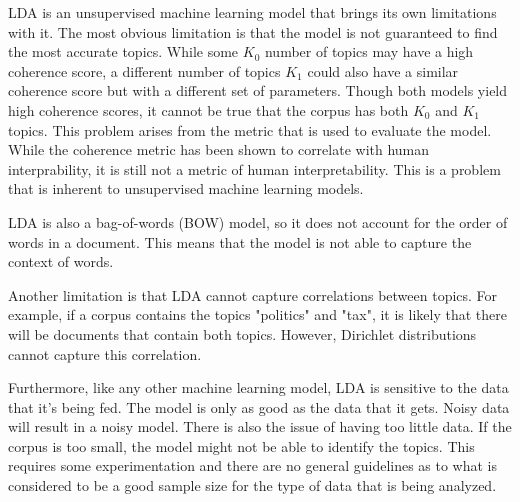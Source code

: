 LDA is an unsupervised machine learning model that brings its own limitations with it. The most obvious limitation is that the model is not guaranteed to find the most accurate topics. While some $K_0$ number of topics may have a high coherence score, a different number of topics $K_1$ could also have a similar coherence score but with a different set of parameters. Though both models yield high coherence scores, it cannot be true that the corpus has both $K_0$ and $K_1$ topics. This problem arises from the metric that is used to evaluate the model. While the coherence metric has been shown to correlate with human interprability, it is still not a metric of human interpretability. This is a problem that is inherent to unsupervised machine learning models.

LDA is also a bag-of-words (BOW) model, so it does not account for the order of words in a document. This means that the model is not able to capture the context of words.

Another limitation is that LDA cannot capture correlations between topics. For example, if a corpus contains the topics "politics" and "tax", it is likely that there will be documents that contain both topics. However, Dirichlet distributions cannot capture this correlation.

Furthermore, like any other machine learning model, LDA is sensitive to the data that it's being fed. The model is only as good as the data that it gets. Noisy data will result in a noisy model. There is also the issue of having too little data. If the corpus is too small, the model might not be able to identify the topics. This requires some experimentation and there are no general guidelines as to what is considered to be a good sample size for the type of data that is being analyzed.